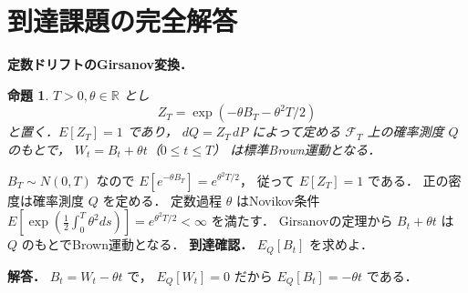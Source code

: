 \documentclass[a5paper,10pt,onecolumn]{jsarticle}
\makeatletter
\theoremstyle{mathnotetheorem}
\newtheorem{proposition}[theorem]{命題}
\renewcommand{\proofname}{証明}
\renewenvironment{proof}[1][\proofname]{%
  \par\pushQED{\qed}\normalfont\topsep4\p@\@plus2\p@\relax
  \trivlist\item[\hskip\labelsep\bfseries #1]\ignorespaces
}{\popQED\endtrivlist\@endpefalse}
\makeatother
\begin{document}
\section{到達課題の完全解答}
\noindent\textbf{定数ドリフトのGirsanov変換．}
\begin{proposition}
$T>0,\theta\in\mathbb R$ とし
\[
Z_T=\exp(-\theta B_T-\theta^2T/2)
\]
と置く．$E[Z_T]=1$ であり，
$dQ=Z_T\,dP$ によって定める
$\mathcal F_T$ 上の確率測度 $Q$ のもとで，
$W_t=B_t+\theta t$（$0\le t\le T$）
は標準Brown運動となる．
\end{proposition}
\begin{proof}
$B_T\sim N(0,T)$ なので
$E[e^{-\theta B_T}]=e^{\theta^2T/2}$，
従って $E[Z_T]=1$ である．
正の密度は確率測度 $Q$ を定める．
定数過程 $\theta$ はNovikov条件
$E[\exp(\frac12\int_0^T\theta^2ds)]
=e^{\theta^2T/2}<\infty$ を満たす．
Girsanovの定理から $B_t+\theta t$ は
$Q$ のもとでBrown運動となる．
\end{proof}
\noindent\textbf{到達確認．}
$E_Q[B_t]$ を求めよ．
\par\noindent\textbf{解答．}
$B_t=W_t-\theta t$ で，
$E_Q[W_t]=0$ だから $E_Q[B_t]=-\theta t$ である．
\end{document}
